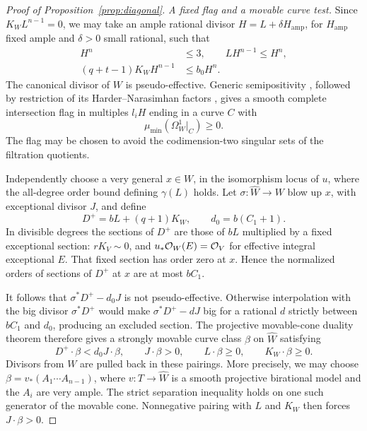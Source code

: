 \begin{proof}[Proof of Proposition~\ref{prop:diagonal}]
\medskip\noindent\emph{A fixed flag and a movable curve test.}
Since $K_WL^{n-1}=0$, we may take an ample rational divisor
$H=L+\delta H_{\mathrm{amp}}$, for $H_{\mathrm{amp}}$ fixed ample
and $\delta>0$ small rational, such that
\begin{equation}\label{eq:diag-H}
 \begin{split}
 H^n&\le3,\qquad LH^{n-1}\le H^n,\\
 (q+t-1)K_WH^{n-1}&\le b_0H^n.
 \end{split}
\end{equation}
The canonical divisor of $W$ is pseudo-effective. Generic
semipositivity \cite[Theorem~2.1]{CampanaPaun2015}, followed by
restriction of its Harder--Narasimhan factors
\cite[Theorem~6.1]{MehtaRamanathan1982}, gives a smooth complete
intersection flag in multiples $l_iH$ ending in a curve $C$ with
\begin{equation}\label{eq:diag-cotangent}
 \mu_{\min}(\Omega_W^1|_C)\ge0.
\end{equation}
The flag may be chosen to avoid the codimension-two singular sets
of the filtration quotients.

Independently choose a very general $x\in W$, in the isomorphism
locus of $u$, where the all-degree order bound defining $\gamma(L)$
holds. Let $\sigma:\widehat W\to W$ blow up $x$, with exceptional
divisor $J$, and define
\[
 D^+=bL+(q+1)K_W,\qquad d_0=b(C_1+1).
\]
In divisible degrees the sections of $D^+$ are those of $bL$
multiplied by a fixed exceptional section: $rK_V\sim0$, and
$u_*\mathcal O_W(E)=\mathcal O_V$ for effective integral exceptional $E$.
That fixed section has order zero at $x$. Hence the normalized
orders of sections of $D^+$ at $x$ are at most $bC_1$.

It follows that $\sigma^*D^+-d_0J$ is not pseudo-effective.
Otherwise interpolation with the big divisor $\sigma^*D^+$ would
make $\sigma^*D^+-dJ$ big for a rational $d$ strictly between
$bC_1$ and $d_0$, producing an excluded section. The projective
movable-cone duality theorem \cite[Theorem~2.2, preprint]{BDPP2013}
therefore gives a strongly movable curve class $\beta$ on
$\widehat W$ satisfying
\begin{equation}\label{eq:diag-test}
 D^+\cdot\beta<d_0J\cdot\beta,
 \qquad J\cdot\beta>0,
 \qquad L\cdot\beta\ge0,
 \qquad K_W\cdot\beta\ge0.
\end{equation}
Divisors from $W$ are pulled back in these pairings. More precisely,
we may choose $\beta=v_*(A_1\cdots A_{n-1})$, where
$v:T\to\widehat W$ is a smooth projective birational model and
the $A_i$ are very ample. The strict separation inequality holds on
one such generator of the movable cone. Nonnegative pairing with
$L$ and $K_W$ then forces $J\cdot\beta>0$.


\end{proof}
